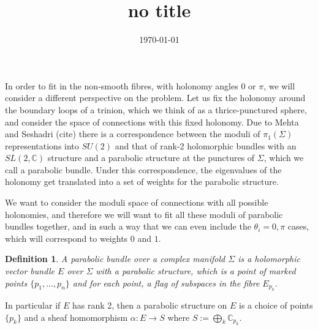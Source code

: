 \documentclass[]{article}
\title{no title}
\date{\today}
\newtheorem{definition}{Definition}
\newcommand{\C}{\mathbb{C}}
\begin{document}
	In order to fit in the non-smooth fibres, with holonomy angles $0$ or $\pi$, we will consider a different perspective on the problem. Let us fix the holonomy around the boundary loops of a trinion, which we think of as a thrice-punctured sphere, and consider the space of connections with this fixed holonomy. Due to Mehta and Seshadri (cite) there is a correspondence between the moduli of $\pi_1(\Sigma)$ representations into $SU(2)$ and that of rank-2 holomorphic bundles with an $SL(2,\C)$ structure and a parabolic structure at the punctures of $\Sigma$, which we call a parabolic bundle. Under this correspondence, the eigenvalues of the holonomy get translated into a set of weights for the parabolic structure. 
	
	We want to consider the moduli space of connections with all possible holonomies, and therefore we will want to fit all these moduli of parabolic bundles together, and in such a way that we can even include the $\theta_i = 0,\pi$ cases, which will correspond to weights $0$ and $1$. 
\begin{definition}
	A \emph{parabolic bundle} over a complex manifold $\Sigma$ is a holomorphic vector bundle $E$ over $\Sigma$ with a \emph{parabolic structure}, which is a point of marked points $\{p_1,...,p_n\}$ and for each point, a flag of subspaces in the fibre $E_{p_k}$. 
\end{definition}
In particular if $E$ has rank 2, then a parabolic structure on $E$ is a choice of points $\{p_k\}$ and a sheaf homomorphism $\alpha:E\to S$ where $S := \bigoplus_{k} \C_{p_k}$.
\end{document}
